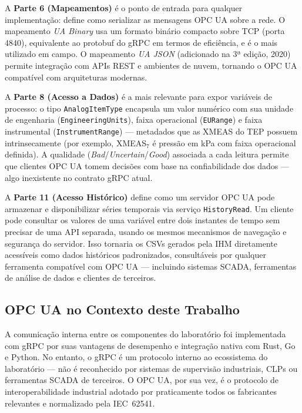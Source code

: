 A \textbf{Parte 6 (Mapeamentos)} é o ponto de entrada para qualquer implementação: define como serializar as mensagens OPC UA sobre a rede. O mapeamento \textit{UA Binary} usa um formato binário compacto sobre TCP (porta 4840), equivalente ao protobuf do gRPC em termos de eficiência, e é o mais utilizado em campo. O mapeamento \textit{UA JSON} (adicionado na 3ª edição, 2020) permite integração com APIs REST e ambientes de nuvem, tornando o OPC UA compatível com arquiteturas modernas.

A \textbf{Parte 8 (Acesso a Dados)} é a mais relevante para expor variáveis de processo: o tipo \texttt{AnalogItemType} encapsula um valor numérico com sua unidade de engenharia (\texttt{EngineeringUnits}), faixa operacional (\texttt{EURange}) e faixa instrumental (\texttt{InstrumentRange}) — metadados que as XMEAS do TEP possuem intrinsecamente (por exemplo, XMEAS$_7$ é pressão em kPa com faixa operacional definida). A qualidade (\textit{Bad}/\textit{Uncertain}/\textit{Good}) associada a cada leitura permite que clientes OPC UA tomem decisões com base na confiabilidade dos dados — algo inexistente no contrato gRPC atual.

A \textbf{Parte 11 (Acesso Histórico)} define como um servidor OPC UA pode armazenar e disponibilizar séries temporais via serviço \texttt{HistoryRead}. Um cliente pode consultar os valores de uma variável entre dois instantes de tempo sem precisar de uma API separada, usando os mesmos mecanismos de navegação e segurança do servidor. Isso tornaria os CSVs gerados pela IHM diretamente acessíveis como dados históricos padronizados, consultáveis por qualquer ferramenta compatível com OPC UA — incluindo sistemas SCADA, ferramentas de análise de dados e clientes de terceiros.

\subsection{OPC UA no Contexto deste Trabalho}

A comunicação interna entre os componentes do laboratório foi implementada com gRPC por suas vantagens de desempenho e integração nativa com Rust, Go e Python. No entanto, o gRPC é um protocolo interno ao ecossistema do laboratório — não é reconhecido por sistemas de supervisão industriais, CLPs ou ferramentas SCADA de terceiros. O OPC UA, por sua vez, é o protocolo de interoperabilidade industrial adotado por praticamente todos os fabricantes relevantes e normalizado pela IEC~62541.

